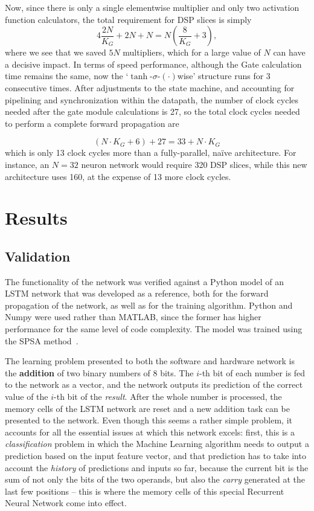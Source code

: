 \documentclass[conference]{IEEEtran}
\begin{document}
Now, since there is only a single elementwise multiplier and only two activation function calculators, the total requirement for DSP slices is simply
\begin{equation}\label{eq:numdsp_network-opt}
    4\frac{2N}{K_G} + 2N + N = N \left( \frac{8}{K_G} + 3 \right),
\end{equation}
where we see that we saved $5N$ multipliers, which for a large value of $N$ can have a decisive impact. In terms of speed performance, although the Gate
calculation time remains the same, now the `$\tanh$-$\sigma$-$(\cdot)$wise' structure runs for 3 consecutive times. After adjustments to the state machine, and accounting for
pipelining and synchronization within the datapath, the number of clock cycles needed after the gate module calculations is 27, so the total clock cycles needed to perform a
complete forward propagation are

\begin{equation}\label{eq:numcc_network-opt}
    (N \cdot K_G + 6) + 27  = 33 + N\cdot K_G
\end{equation}
which is only 13 clock cycles more than a fully-parallel, naïve architecture. For instance, an $N=32$ neuron network would
require 320 DSP slices, while this new architecture uses 160, at the expense of 13 more clock cycles.

\section{Results}\label{sec:results}

\subsection{Validation}\label{sec:res-val}

The functionality of the network was verified against a Python model of an LSTM network that was developed as a reference,
both for the forward propagation of the network, as well as for the training algorithm. Python and Numpy were used rather than MATLAB,
since the former has higher performance for the same level of code complexity. The model was trained using the SPSA method~\cite{Spall98}.

The learning problem presented to both the software and hardware network is the \textbf{addition} of two binary numbers of 8 bits. The $i$-th
bit of each number is fed to the network as a vector, and the network outputs its prediction of the correct value of the $i$-th bit
of the \emph{result}. After the whole number is processed, the memory cells of the LSTM network are reset and a new addition
task can be presented to the network. Even though this seems a rather simple problem, it accounts for all the essential issues at which this
network excels: first, this is a \emph{classification} problem in which the Machine Learning algorithm needs to output a prediction based on
the input feature vector, and that prediction has to take into account the \emph{history} of predictions and inputs so far, because the current
bit is the sum of not only the bits of the two operands, but also the \emph{carry} generated at the last few positions -- this is where the
memory cells of this special Recurrent Neural Network come into effect.
\end{document}
